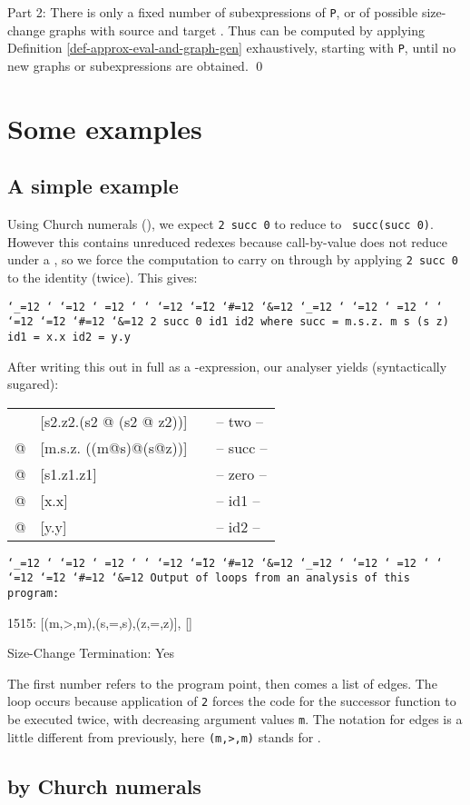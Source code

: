 \documentclass{LMCS}
\makeatletter
\newcommand{\fl}{\noindent}
\newcommand{\hair}{\hspace{2mm}}
\newcommand{\bt}{\begin{tabular}}
\newcommand{\et}{\end{tabular}}
\newcommand{\bp}{\begin{program}\small}
\newcommand{\ep}{\end{program}}
\newcommand{\eprf}{\qed}
\newcommand{\programenvironment}{\programmode \def\par{\leavevmode\endgraf}\obeylines\nobreak \programmode}
\newcommand{\programmode}{\tt \catcode`\_=12 \catcode`\?=12 \catcode`\.=12 \catcode`\,=12
	\catcode`\;=12 \catcode`\:=12 \catcode`\@=12 \catcode`\~=12
        \catcode`\#=12 \catcode`\&=12      \obeyspaces\frenchspacing}
\newenvironment{programintext}{\programenvironment}{}
\newenvironment{program}{\setlength{\partopsep}{0mm}\setlength{\topsep}{0mm}
	\begin{trivlist}\item[]
\hspace*{5mm}\begin{minipage}{1.0\textwidth}
\vspace{1mm}
	\begin{programintext}
	}{\end{programintext}
	\vspace{1mm}
	\end{minipage}
	\end{trivlist}
	\noindent}
\theoremstyle{definition}\newtheorem{env}[thm]{Environment}
\makeatother
\begin{document}
Part 2: There is only a fixed number of subexpressions of {\tt P}, or 
of possible size-change graphs with source and target 
. 
Thus 
can be computed by applying Definition \ref{def-approx-eval-and-graph-gen}
exhaustively, starting with {\tt P}, until no new graphs or 
subexpressions are obtained.
\eprf 


\section{Some examples} \label{sec:examples}

\subsection{A simple example}

\fl Using Church numerals 
(), 
we expect {\tt 2 succ 0} to reduce to {\tt 
succ(succ 0)}. However this  contains unreduced redexes because 
call-by-value does not reduce under a , so we force the 
computation to carry on through by applying {\tt 2 succ 0} to the 
identity (twice). This gives:

\bp
2 succ 0 id1 id2 where
  succ = m.s.z. m s (s z)
  id1  = x.x
  id2  = y.y

\ep
After writing this out in full as a -expression, our 
analyser yields (syntactically sugared):\medskip

{\tt\bt{llll}
      &[s2.z2.(s2 @ (s2 @ z2))] &\hair& -- two --\\
   @ & [m.s.z. \fbox{15:}((m@s)@(s@z))] && -- succ 
   --\\
   @ & [s1.z1.z1]   &&  -- zero --\\
   @ & [x.x]                 && -- id1 --\\
   @ & [y.y]                 && -- id2 --
   \et}

\bp
Output of loops from an analysis of this program:

1515: [(m,>,m),(s,=,s),(z,=,z)], []

Size-Change Termination: Yes

\ep
The first number refers to the program point,
then comes a list of edges. 
The loop occurs because application of {\tt 2} forces the code for 
the successor function to be executed twice, with decreasing argument 
values {\tt m}. The notation for edges is a little
different from previously, here {\tt (m,>,m)} stands for
.



\subsection{  by Church numerals}\label{ex:fnx}
\end{document}
